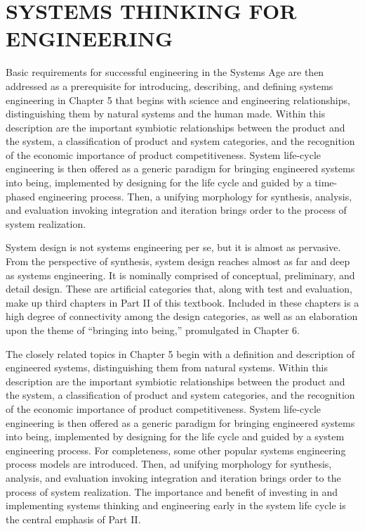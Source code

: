 \part{SYSTEMS THINKING FOR ENGINEERING}\label{part:2}

Basic requirements for successful engineering in the Systems Age are then addressed as a prerequisite for introducing, describing, and defining systems engineering in Chapter 5 that begins with science and engineering relationships, distinguishing them by natural systems and the human made. Within this description are the important symbiotic relationships between the product and the system, a classification of product and system categories, and the recognition of the economic importance of product competitiveness. System life-cycle engineering is then offered as a generic paradigm for bringing engineered systems into being, implemented by designing for the life cycle and guided by a time-phased engineering process. Then, a unifying morphology for synthesis, analysis, and evaluation invoking integration and iteration brings order to the process of system realization.

System design is not systems engineering per se, but it is almost as pervasive. From the perspective of synthesis, system design reaches almost as far and deep as systems engineering. It is nominally comprised of conceptual, preliminary, and detail design. These are artificial categories that, along with test and evaluation, make up third chapters in Part II of this textbook. Included in these chapters is a high degree of connectivity among the design categories, as well as an elaboration upon the theme of ``bringing into being,'' promulgated in Chapter 6.

The closely related topics in Chapter 5 begin with a definition and description of engineered systems, distinguishing them from natural systems. Within this description are the important symbiotic relationships between the product and the system, a classification of product and system categories, and the recognition of the economic importance of product competitiveness. System life-cycle engineering is then offered as a generic paradigm for bringing engineered systems into being, implemented by designing for the life cycle and guided by a system engineering process. For completeness, some other popular systems engineering process models are introduced. Then, ad unifying morphology for synthesis, analysis, and evaluation invoking integration and iteration brings order to the process of system realization. The importance and benefit of investing in and implementing systems thinking and engineering early in the system life cycle is the central emphasis of Part II.





